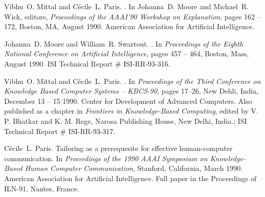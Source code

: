 \begin{thebibliography}{10}
\noindent\hspace*{\itemindent}{\leftskip=0.1in\rightskip=0.1in\hrulefill}

Vibhu~O. Mittal and C{\'e}cile~L. Paris.
.
\newblock In Johanna~D. Moore and Michael~R. Wick, editors, {\em {Proceedings
  of the AAAI'90 Workshop on Explanation}}, pages 162 -- 172, Boston, MA,
  August 1990. American Association for Artificial Intelligence.

\noindent\hspace*{\itemindent}{\leftskip=0.1in\rightskip=0.1in\hrulefill}

Johanna~D. Moore and William~R. Swartout.
.
\newblock In {\em Proceedings of the Eighth National Conference on Artificial
  Intelligence}, pages 457 -- 464, Boston, Mass, August 1990.
\newblock ISI Technical Report \# ISI-RR-93-316.

\noindent\hspace*{\itemindent}{\leftskip=0.1in\rightskip=0.1in\hrulefill}

Vibhu~O. Mittal and C{\'e}cile~L. Paris.
.
\newblock In {\em {Proceedings of the Third Conference on Knowledge Based
  Computer Systems -- {KBCS}-90}}, pages 17--26, New Dehli, India, December 13
  -- 15 1990. Center for Development of Advanced Computers.
\newblock Also published as a chapter in {\it Frontiers in Knowledge-Based
  Computing\/}, edited by V. P. Bhatkar and K. M. Rege, Narosa Publishing
  House, New Delhi, India.; ISI Technical Report \# ISI-RR-93-317.

\noindent\hspace*{\itemindent}{\leftskip=0.1in\rightskip=0.1in\hrulefill}

C\'{e}cile~L. Paris.
\newblock Tailoring as a prerequesite for effective human-computer
  communication.
\newblock In {\em Proceedings of the 1990 AAAI Symposium on Knowledge-Based
  Human Computer Communication}, Stanford, California, March 1990. American
  Association for Artificial Intelligence.
\newblock Full paper in the Proceedings of ILN-91, Nantes, France.


\end{thebibliography}
